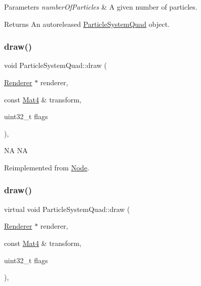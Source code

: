 \begin{DoxyParams}{Parameters}
{\em number\+Of\+Particles} & A given number of particles. \\
\hline
\end{DoxyParams}
\begin{DoxyReturn}{Returns}
An autoreleased \hyperlink{classParticleSystemQuad}{Particle\+System\+Quad} object. 
\end{DoxyReturn}
\mbox{\label{classParticleSystemQuad_a4bfacab6a326829bcc97be90ea9c6a01}} 
\subsubsection{\texorpdfstring{draw()}{draw()}\hspace{0.1cm}{\footnotesize\ttfamily [1/2]}}
{\footnotesize\ttfamily void Particle\+System\+Quad\+::draw (\begin{DoxyParamCaption}\item[{\hyperlink{classRenderer}{Renderer} $\ast$}]{renderer,  }\item[{const \hyperlink{classMat4}{Mat4} \&}]{transform,  }\item[{uint32\+\_\+t}]{flags }\end{DoxyParamCaption})\hspace{0.3cm}{\ttfamily [override]}, {\ttfamily [virtual]}}

NA  NA 

Reimplemented from \hyperlink{classNode_abcf85087a15901deb7c6c1231634c8ab}{Node}.

\mbox{\label{classParticleSystemQuad_ab2e534c8bfc790921b3519647ab91073}} 
\subsubsection{\texorpdfstring{draw()}{draw()}\hspace{0.1cm}{\footnotesize\ttfamily [2/2]}}
{\footnotesize\ttfamily virtual void Particle\+System\+Quad\+::draw (\begin{DoxyParamCaption}\item[{\hyperlink{classRenderer}{Renderer} $\ast$}]{renderer,  }\item[{const \hyperlink{classMat4}{Mat4} \&}]{transform,  }\item[{uint32\+\_\+t}]{flags }\end{DoxyParamCaption})\hspace{0.3cm}{\ttfamily [override]}, {\ttfamily [virtual]}}


